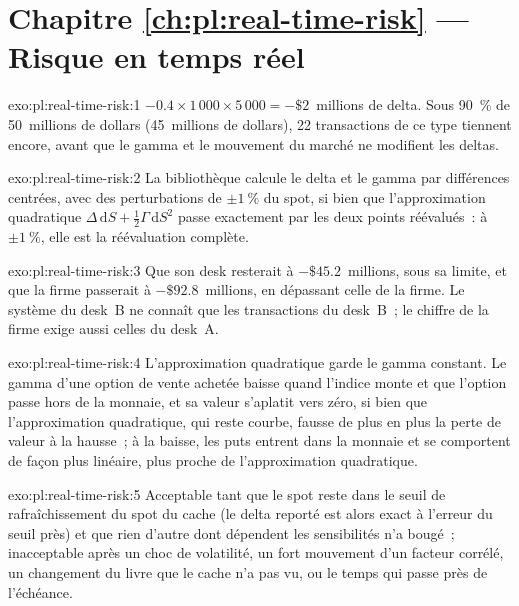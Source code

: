 \section*{Chapitre \ref{ch:pl:real-time-risk} --- Risque en temps réel}

\begin{solution}{exo:pl:real-time-risk:1}
$-0.4 \times 1\,000 \times 5\,000 = -\$2$~millions de delta. Sous 90~\% de 50~millions de dollars (45~millions de dollars), 22 transactions de ce type tiennent encore, avant que le gamma et le
mouvement du marché ne modifient les deltas.
\end{solution}

\begin{solution}{exo:pl:real-time-risk:2}
La bibliothèque calcule le delta et le gamma par différences centrées, avec des perturbations de $\pm1~\%$ du spot, si bien que l'approximation quadratique $\Delta\,\mathrm{d}S +
\frac12\Gamma\,\mathrm{d}S^2$ passe exactement par les deux points réévalués~: à $\pm1~\%$, elle est la réévaluation complète.
\end{solution}

\begin{solution}{exo:pl:real-time-risk:3}
Que son desk resterait à $-\$45.2$~millions, sous sa limite, et que la firme passerait à $-\$92.8$~millions, en dépassant celle de la firme. Le système du desk~B
ne connaît que les transactions du desk~B~; le chiffre de la firme exige aussi celles du desk~A.
\end{solution}

\begin{solution}{exo:pl:real-time-risk:4}
L'approximation quadratique garde le gamma constant. Le gamma d'une option de vente achetée baisse quand l'indice monte et que l'option passe hors de la monnaie, et sa valeur s'aplatit
vers zéro, si bien que l'approximation quadratique, qui reste courbe, fausse de plus en plus la perte de valeur à la hausse~; à la baisse, les puts entrent dans la
monnaie et se comportent de façon plus linéaire, plus proche de l'approximation quadratique.
\end{solution}

\begin{solution}{exo:pl:real-time-risk:5}
Acceptable tant que le spot reste dans le seuil de rafraîchissement du spot du cache (le delta reporté est alors exact à
l'erreur du seuil près) et que rien d'autre dont dépendent les sensibilités n'a bougé~; inacceptable après un choc de volatilité, un fort
mouvement d'un facteur corrélé, un changement du livre que le cache n'a pas vu, ou le temps qui passe près de l'échéance.
\end{solution}

